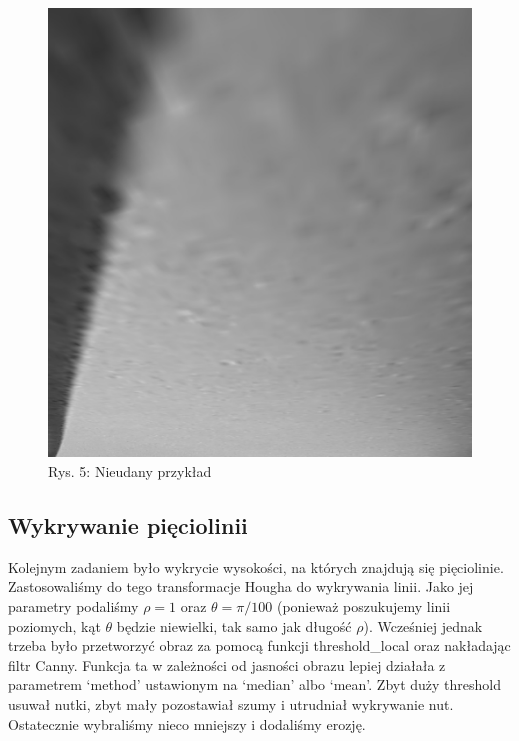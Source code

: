 \documentclass[11pt]{article}
\begin{document}
\captionsetup[figure]{labelformat=empty}
\begin{figure}[h!]
	\centering
	\graphicspath{ {output/} }
	\includegraphics[scale=0.3]{warped15_gray.jpg}
	\caption{Rys. 5: Nieudany przykład}
	\label{fig:universe}
\end{figure}

\pagebreak
\subsection{Wykrywanie pięciolinii}

Kolejnym zadaniem było wykrycie wysokości, na których znajdują się pięciolinie.
Zastosowaliśmy do tego transformacje Hougha do wykrywania linii.
Jako jej parametry podaliśmy $\rho = 1 $ oraz $\theta = \pi / 100$ (ponieważ poszukujemy linii poziomych, kąt $\theta$ będzie niewielki, tak samo jak długość $\rho$).
Wcześniej jednak trzeba było przetworzyć obraz za pomocą funkcji threshold\_local oraz nakładając filtr Canny. 
Funkcja ta w zależności od jasności obrazu lepiej działała z parametrem `method' ustawionym na `median' albo `mean'.
Zbyt duży threshold usuwał nutki, zbyt mały pozostawiał szumy i utrudniał wykrywanie nut.
Ostatecznie wybraliśmy nieco mniejszy i dodaliśmy erozję.
\newline
\end{document}
